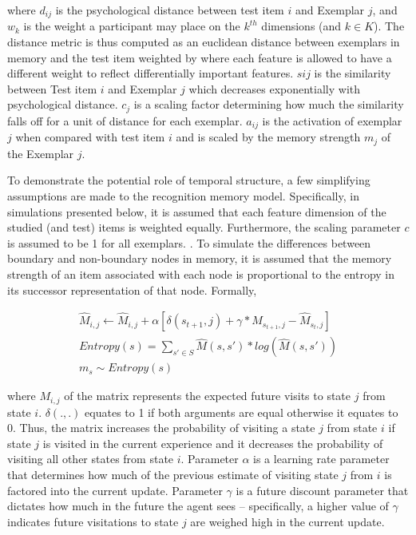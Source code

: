 where $d_{ij}$ is the psychological distance between test item $i$ and Exemplar $j$, and $w_k$ is the weight a participant may place on the $k^{th}$ dimensions (and $k \in K$). The distance metric is thus computed as an euclidean distance between exemplars in memory and the test item weighted by where each feature is allowed to have a different weight to reflect differentially important features. $s{ij}$ is the similarity between Test item $i$ and Exemplar $j$ which decreases exponentially with psychological distance. $c_j$ is a scaling factor determining how much the similarity falls off for a unit of distance for each exemplar. $a_{ij}$ is the activation of exemplar $j$ when compared with test item $i$ and is scaled by the memory strength $m_j$ of the Exemplar $j$. 

To demonstrate the potential role of temporal structure, a few simplifying assumptions are  made to the recognition memory model. Specifically, in simulations presented below, it is assumed that each feature dimension of the studied (and test) items is weighted equally. Furthermore, the scaling parameter $c$ is assumed to be 1 for all exemplars. . To simulate the differences between boundary and non-boundary nodes in memory, it is assumed that the memory strength of an item associated with each node is proportional to the entropy in its successor representation of that node. Formally, 


\begin{equation}
    \begin{aligned}
        \hat{M}_{i,j} \leftarrow \hat{M}_{i,j} + \alpha[\delta(s_{t+1},j) + \gamma*\hat{M}_{s_{t+1},j} - \hat{M}_{s_t,j}] \\ 
        Entropy(s) = \sum_{s' \in S} \hat{M}(s, s') * log(\hat{M}(s, s')) \\ 
        m_s \sim Entropy(s) 
    \end{aligned}
\end{equation}

where $M_{i,j}$ of the matrix represents the expected future visits to state $j$ from state $i$. $\delta(., .)$ equates to 1 if both arguments are equal otherwise it equates to 0. Thus, the matrix increases the probability of visiting a state $j$ from state $i$ if state $j$ is visited in the current experience and it decreases the probability of visiting all other states from state $i$. Parameter $\alpha$ is a learning rate parameter that determines how much of the previous estimate of visiting state $j$ from $i$ is factored into the current update. Parameter $\gamma$ is a future discount parameter that dictates how much in the future the agent sees -- specifically, a higher value of $\gamma$ indicates future visitations to state $j$ are weighed high in the current update.

